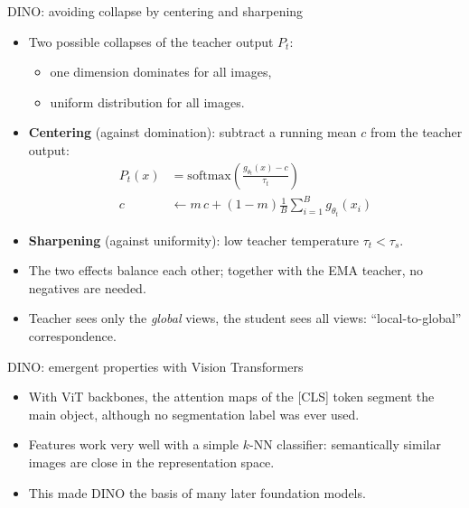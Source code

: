 \documentclass[xcolor=pdftex,dvipsnames,table]{beamer}
\begin{document}
\begin{frame}{DINO: avoiding collapse by centering and sharpening}
\begin{itemize}
\item Two possible collapses of the teacher output $P_t$:
\begin{itemize}
   \item one dimension dominates for all images,
   \item uniform distribution for all images.
\end{itemize}
\item \textbf{Centering} (against domination): subtract a running mean $c$ from the teacher output:
\begin{align*}
P_t(x) &= \mathrm{softmax}\!\left(\frac{g_{\theta_t}(x) - c}{\tau_t}\right) \\
c &\leftarrow m\, c + (1-m)\frac{1}{B}\sum_{i=1}^B g_{\theta_t}(x_i)
\end{align*}
\item \textbf{Sharpening} (against uniformity): low teacher temperature $\tau_t < \tau_s$.
\item The two effects balance each other; together with the EMA teacher, no negatives are needed.
\item Teacher sees only the \emph{global} views, the student sees all views: ``local-to-global'' correspondence.
\end{itemize}
\end{frame}

\begin{frame}{DINO: emergent properties with Vision Transformers}
\begin{itemize}
\item With ViT backbones, the attention maps of the [CLS] token segment the main object, although no segmentation label was ever used.
\item Features work very well with a simple $k$-NN classifier: semantically similar images are close in the representation space.
\item This made DINO the basis of many later foundation models.
\end{itemize}
\end{frame}
\end{document}
